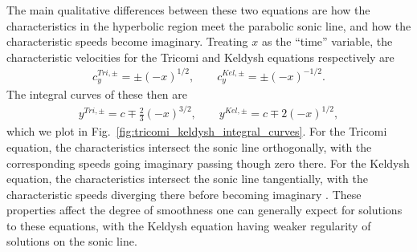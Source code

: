 \documentclass{ws-ijmpd}
\begin{document}
The main qualitative differences between these two equations are how the 
characteristics in the hyperbolic region meet the parabolic sonic line, 
and how the characteristic speeds become imaginary.
Treating $x$ as the ``time'' variable, the characteristic velocities
for the Tricomi and Keldysh equations respectively are
\begin{align}
   c_y^{Tri,\pm}
   =
   \pm\left(-x\right)^{1/2}
   ,\qquad
   c_y^{Kel,\pm}
   =
   \pm\left(-x\right)^{-1/2}
   .
\end{align}
The integral curves of these then are
\begin{align}
   y^{Tri,\pm}
   =
   c \mp \frac{2}{3}\left(-x\right)^{3/2}
   ,\qquad
   y^{Kel,\pm}
   =
   c \mp 2\left(-x\right)^{1/2}
   ,
\end{align}
which we plot in Fig.~\ref{fig:tricomi_keldysh_integral_curves}.
For the Tricomi equation, the characteristics intersect the sonic line
orthogonally, with the corresponding speeds going imaginary passing 
though zero there.
For the Keldysh equation, the characteristics intersect the 
sonic line tangentially, with the characteristic speeds diverging there 
before becoming imaginary .
These properties affect the degree of smoothness one can generally expect for 
solutions to these equations, with the Keldysh equation having weaker 
regularity of solutions on the sonic line\cite{otway2015elliptic}.
\end{document}
